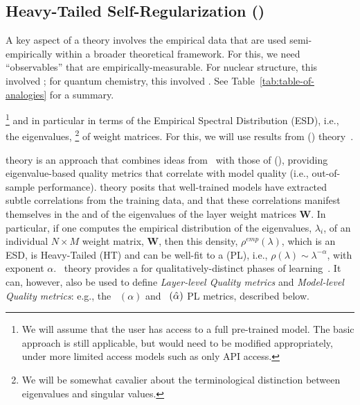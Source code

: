 \subsection{Heavy-Tailed Self-Regularization (\HTSR)}

A key aspect of a \SemiEmpirical theory involves the empirical data that are used semi-empirically within a broader theoretical framework.
For this, we need ``observables'' that are empirically-measurable.
For nuclear structure, this involved ;
for quantum chemistry, this involved .
See Table~\ref{tab:table-of-analogies} for a summary.



\footnote{We will assume that the user has access to a full pre-trained model. The basic \SemiEmpirical approach is still applicable, but would need to be modified appropriately, under more limited access models such as only API access.}
and in particular in terms of the Empirical Spectral Distribution (ESD), i.e., the eigenvalues,%
\footnote{We will be somewhat cavalier about the terminological distinction between eigenvalues and singular values.}
of weight matrices.
For this, we will use results from \emph{\HeavyTailedSelfRegularization} (\HTSR) theory~\cite{MM19_HTSR_ICML,MM20_SDM,MM18_TR_JMLRversion}.

\HTSR theory is an approach that combines ideas from \STATMECH~with those of \emph{\HeavyTailed} \emph{\RandomMatrixTheory} (\RMT),
providing eigenvalue-based quality metrics that correlate with model quality (i.e., out-of-sample performance).
\HTSR theory posits that well-trained models have extracted subtle correlations from the training data, and that these correlations manifest themselves in the \SHAPE and \SCALE of the eigenvalues of the layer weight matrices $\mathbf{W}$. 
In particular, if one computes the empirical distribution of the eigenvalues, $\lambda_i$, of an individual  $N \times M$ weight matrix, $\mathbf{W}$, then this density, $\rho^{emp}(\lambda)$, which is an ESD, is Heavy-Tailed (HT) and can be well-fit to a \emph{\PowerLaw} (PL), i.e., $\rho(\lambda)\sim\lambda^{-\alpha}$, with exponent $\alpha$.
\HTSR~theory provides a \emph{\Phenomenology} for qualitatively-distinct phases of learning~\cite{MM18_TR_JMLRversion}.
It can, however, also be used to define \emph{Layer-level Quality metrics} and \emph{Model-level Quality metrics}: e.g., the \ALPHA~$(\alpha)$ and \ALPHAHAT~$(\hat\alpha)$ PL metrics, described below.

